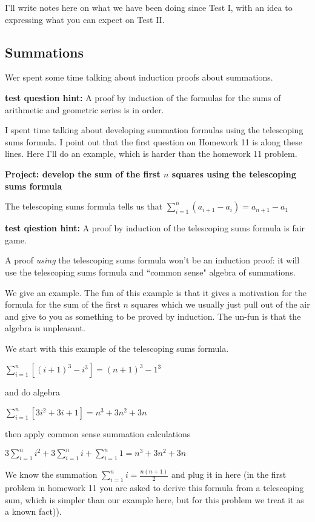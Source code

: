 \documentclass[12pt]{article}
\begin{document}
I'll write notes here on what we have been doing since Test I, with an idea to expressing what you can expect on Test II.

\subsection{Summations}  Wer spent some time talking about induction proofs about summations.  

{\bf test question hint:}  A proof by induction of the formulas for the sums of arithmetic and geometric series is in order.

I spent time talking about developing summation formulas using the telescoping sums formula.  I point out that the first question on Homework 11 is along these lines.  Here I'll do an example, which is harder than the homework 11 problem.

{\bf Project:  develop the sum of the first $n$ squares using the telescoping sums formula}

The telescoping sums formula tells us that $\sum_{i=1}^n (a_{i+1}-a_i) = a_{n+1}-a_1$

{\bf test qiestion hint:}  A proof by induction of the telescoping sums formula is fair game.

A proof {\em using\/} the telescoping sums formula won't be an induction proof:  it will use the telescoping sums formula and ``common sense" algebra of summations.

We give an example.  The fun of this example is that it gives a motivation for the formula for the sum of the first $n$ squares which we usually just pull out of the air and give to you as something to be proved by induction.  The un-fun is that the algebra is unpleasant.

We start with this example of the telescoping sums formula.

$\sum_{i=1}^n[(i+1)^3 -i^3] = (n+1)^3-1^3$

and do algebra

$\sum_{i=1}^n[3i^2+3i+1] = n^3+3n^2+3n$

then apply common sense summation calculations

$3\sum_{i=1}^ni^2 + 3\sum_{i=1}^n i + \sum_{i=1}^n 1 = n^3+3n^2+3n$

We know the summation $\sum_{i=1}^n i = \frac{n(n+1)}2$ and plug it in here (in the first problem in homework 11
you are asked to derive this formula from a telescoping sum, which is simpler than our example here, but for this problem we treat it as a known fact)).
\end{document}
